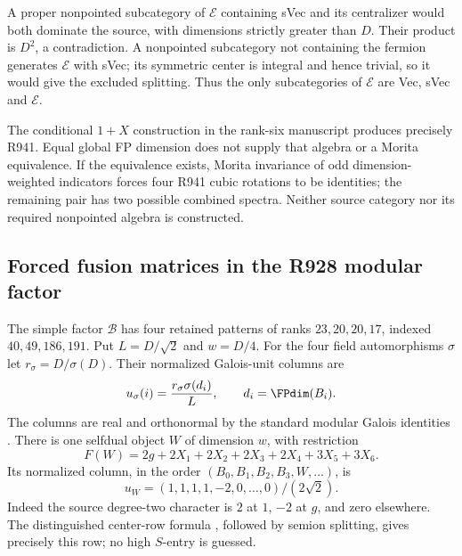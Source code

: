 A proper nonpointed subcategory of $\mathcal E$ containing sVec and its
centralizer would both dominate the source, with dimensions strictly
greater than $D$. Their product is $D^2$, a contradiction. A nonpointed
subcategory not containing the fermion generates $\mathcal E$ with
sVec; its symmetric center is integral and hence trivial, so it would
give the excluded splitting. Thus the only subcategories of
$\mathcal E$ are Vec, sVec and $\mathcal E$.

The conditional $1+X$ construction in the rank-six manuscript produces
precisely R941. Equal global FP dimension does not supply that algebra
or a Morita equivalence. If the equivalence exists, Morita invariance of
odd dimension-weighted indicators forces four R941 cubic rotations to
be identities; the remaining pair has two possible combined spectra.
Neither source category nor its required nonpointed algebra is
constructed.

\subsection{Forced fusion matrices in the R928 modular factor}
The simple factor $\mathcal B$ has four retained patterns of ranks
$23,20,20,17$, indexed $40,49,186,191$. Put $L=D/\sqrt2$ and $w=D/4$.
For the four field automorphisms $\sigma$ let
$r_\sigma=D/\sigma(D)$. Their normalized Galois-unit columns are
\[
 u_\sigma(i)=\frac{r_\sigma\sigma(d_i)}{L},
 \qquad d_i=\FPdim(B_i).
\]
The columns are real and orthonormal by the standard modular Galois
identities \cite{DLNGalois}. There is one selfdual object $W$ of
dimension $w$, with restriction
\[
 F(W)=2g+2X_1+2X_2+2X_3+2X_4+3X_5+3X_6.
\]
Its normalized column, in the order $(B_0,B_1,B_2,B_3,W,\ldots)$, is
\[
 u_W=(1,1,1,1,-2,0,\ldots,0)/(2\sqrt2).
\]
Indeed the source degree-two character is $2$ at $1$, $-2$ at $g$, and
zero elsewhere. The distinguished center-row formula
\cite{DeshpandeCenter}, followed by semion splitting, gives precisely
this row; no high $S$-entry is guessed.

